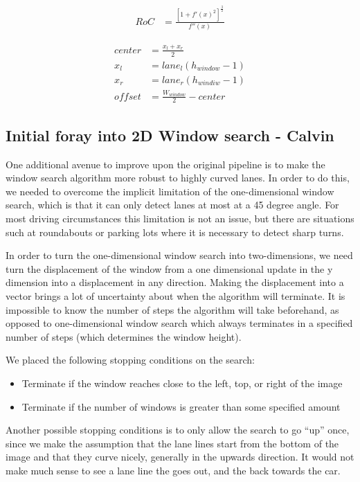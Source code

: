 \documentclass[twoside,twocolumn]{article}
\begin{document}
\begin{align} \label{eq:ROC}
RoC &= \frac{[1 + f'(x)^2]^\frac{3}{2}}{f''(x)}
\end{align}

\begin{subequations}
\begin{align} \label{eq:offset}
center &= \frac{x_{l} + x_{r}}{2} \\
x_{l} &= lane_{l}(h_{window} - 1) \\
x_{r} &= lane_{r}(h_{windiw} - 1) \\
offset &= \frac{W_{window}}{2} - center
\end{align}
\end{subequations}

\subsection{Initial foray into 2D Window search - Calvin}
\par One additional avenue to improve upon the original pipeline is to make the window search algorithm more robust to highly curved lanes. In order to do this, we needed to overcome the implicit limitation of the one-dimensional window search, which is that it can only detect lanes at most at a 45 degree angle. For most driving circumstances this limitation is not an issue, but there are situations such at roundabouts or parking lots where it is necessary to detect sharp turns.
\par In order to turn the one-dimensional window search into two-dimensions, we need turn the displacement of the window from a one dimensional update in the y dimension into a displacement in any direction. Making the displacement into a vector brings a lot of uncertainty about when the algorithm will terminate. It is impossible to know the number of steps the algorithm will take beforehand, as opposed to one-dimensional window search which always terminates in a specified number of steps (which determines the window height).
\par We placed the following stopping conditions on the search:
\begin{itemize}
\item Terminate if the window reaches close to the left, top, or right of the image
\item Terminate if the number of windows is greater than some specified amount
\end{itemize}
Another possible stopping conditions is to only allow the search to go “up” once, since we make the assumption that the lane lines start from the bottom of the image and that they curve nicely, generally in the upwards direction. It would not make much sense to see a lane line the goes out, and the back towards the car.
\end{document}

